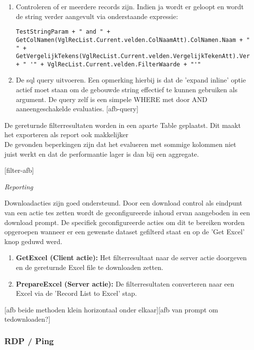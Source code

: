 \begin{itemize}
\begin{enumerate}
\begin{lstlisting}
\end{lstlisting}
        \item Controleren of er meerdere records zijn. Indien ja wordt er geloopt en wordt de string verder aangevult via  onderstaande expressie:
\begin{lstlisting}
TestStringParam + " and " + GetColNamen(VglRecList.Current.velden.ColNaamAtt).ColNamen.Naam + " " + GetVergelijkTekens(VglRecList.Current.velden.VergelijkTekenAtt).VergelijkTekens.Teken + " '" + VglRecList.Current.velden.FilterWaarde + "'"
\end{lstlisting}
        \item De sql query uitvoeren. Een opmerking hierbij is dat de 'expand inline' optie actief moet staan om de gebouwde string effectief te kunnen gebruiken als argument. De query zelf is een simpele WHERE met door AND aaneengeschakelde evaluaties.
        [afb-query]
    \end{enumerate}
    De gereturnde filterresultaten worden in een aparte Table geplaatst. Dit maakt het exporteren als report ook makkelijker\\
    De gevonden beperkingen zijn dat het evalueren met sommige kolommen niet juist werkt en dat de performantie lager is dan bij een aggregate.
\end{itemize}

[filter-afb]

\textit{Reporting}

Downloadacties zijn goed ondersteund. Door een download control als eindpunt van een actie tes zetten wordt de geconfigureerde inhoud ervan aangeboden in een download prompt. De specifiek geconfigureerde acties om dit te bereiken worden opgeroepen wanneer er een gewenste dataset gefilterd staat en op de 'Get Excel' knop geduwd werd.
\begin{enumerate}
    \item \textbf{GetExcel (Client actie):} Het filterresultaat naar de server actie doorgeven en de gereturnde Excel file te downloaden zetten.
    \item \textbf{PrepareExcel (Server actie):} De filterresultaten converteren naar een Excel via de 'Record List to Excel' stap.
\end{enumerate}

[afb beide methoden klein horizontaal onder elkaar][afb van prompt om tedownloaden?]

\subsubsection{RDP / Ping}

